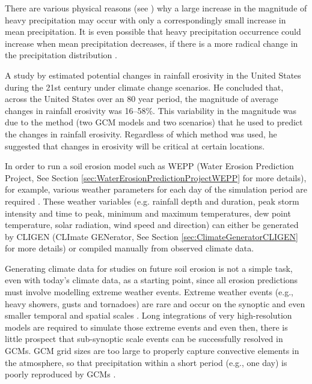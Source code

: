 
There are various physical reasons (see \citealp{trenberth2000-12}) why a large
increase in the magnitude of heavy precipitation may occur with only a
correspondingly small increase in mean precipitation. It is even possible that
heavy precipitation occurrence could increase when mean precipitation decreases,
if there is a more radical change in the precipitation distribution
\citep{osborn2002-1313}.

A study by \citet{nearing2001-229} estimated potential changes in rainfall
erosivity in the United States during the 21st century under climate change
scenarios. He concluded that, across the United States over an 80 year
period, the magnitude of average changes in rainfall erosivity was 16--58\%.
This variability in the magnitude was due to the method (two GCM models and
two scenarios) that he used to predict the changes in rainfall erosivity.
Regardless of which method was used, he suggested that changes in erosivity will
be critical at certain locations.

In order to run a soil erosion model such as WEPP (Water Erosion Prediction
Project, See Section \ref{sec:WaterErosionPredictionProjectWEPP} for more
details), for example, various weather parameters for each day of the
simulation period are required \citep{flanagan1995-usda}. These weather
variables (e.g. rainfall depth and duration, peak storm intensity and time to
peak, minimum and maximum temperatures, dew point temperature, solar radiation,
wind speed and direction) can either be generated by CLIGEN (CLImate GENerator,
See Section \ref{sec:ClimateGeneratorCLIGEN} for more details) or compiled
manually from observed climate data.

Generating climate data for studies on future soil erosion is not a simple task,
even with today's climate data, as a starting point, since all erosion
predictions must involve modelling extreme weather events. Extreme weather
events (e.g., heavy showers, gusts and tornadoes) are rare and occur on the
synoptic and even smaller temporal and spatial scales
\citep{schubert1997-223,katz1999-133,coppus2002-1365}. Long integrations of very
high-resolution models are required to simulate those extreme events and even
then, there is little prospect that sub-synoptic scale events can be
successfully resolved in GCMs. GCM grid sizes are too large to properly capture
convective elements in the atmosphere, so that precipitation within a short
period (e.g., one day) is poorly reproduced by GCMs \citep{schubert1997-223}.

